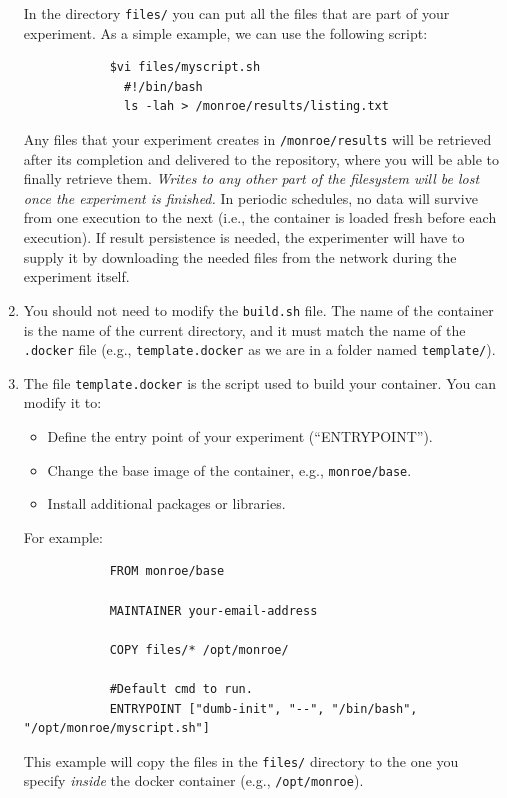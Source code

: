 \documentclass[a4paper,10pt]{article}
\newcommand{\VerbatimFont}{\footnotesize}
\newcommand{\identifier}[1]{{\texttt{\small{#1}}}}
\begin{document}
\begin{enumerate}
		In the directory \identifier{files/} you can put all the files that are part of your experiment.
		As a simple example, we can use the following script:
		{\VerbatimFont\begin{verbatim}
			$vi files/myscript.sh
			  #!/bin/bash
			  ls -lah > /monroe/results/listing.txt
		\end{verbatim}}
		Any files that your experiment creates in \identifier{/monroe/results} will be retrieved after its completion and delivered to the repository, where you will be able to finally retrieve them.
		\emph{Writes to any other part of the filesystem will be lost once the experiment is finished.}
		In periodic schedules, no data will survive from one execution to the next (i.e., the container is loaded fresh before each execution).
		If result persistence is needed, the experimenter will have to supply it by downloading the needed files from the network during the experiment itself.
	\item You should not need to modify the \identifier{build.sh} file. The name of the container is the name of the current directory, and it must match the name of the \identifier{.docker} file (e.g., \identifier{template.docker} as we are in a folder named \identifier{template/}).
	
	\item The file \identifier{template.docker} is the script used to build your container.
		You can modify it to:
		\begin{itemize}
			\item Define the entry point of your experiment (``ENTRYPOINT'').
			\item Change the base image of the container, e.g., \identifier{monroe/base}.
			\item Install additional packages or libraries.
		\end{itemize}
		For example:
		{\VerbatimFont\begin{verbatim}
			FROM monroe/base
		
			MAINTAINER your-email-address
		
			COPY files/* /opt/monroe/
		
			#Default cmd to run.
			ENTRYPOINT ["dumb-init", "--", "/bin/bash", "/opt/monroe/myscript.sh"]
		\end{verbatim}}
	
		This example will copy the files in the \identifier{files/} directory to the one you specify \emph{inside} the docker container (e.g., \identifier{/opt/monroe}).
		

\end{enumerate}
\end{document}
